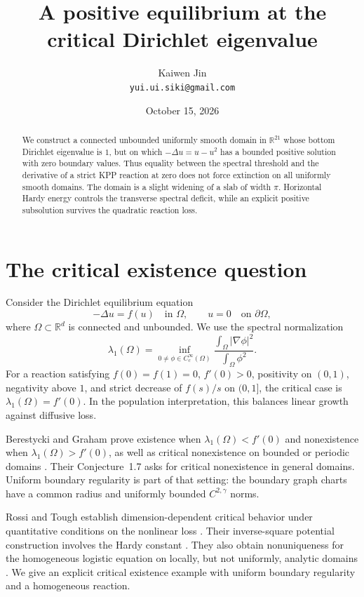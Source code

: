 \documentclass[11pt,a4paper]{article}
\title{A positive equilibrium at the critical Dirichlet eigenvalue}
\author{Kaiwen Jin\\[2pt]\small\texttt{yui.ui.siki@gmail.com}}
\date{October 15, 2026}
\newcommand{\R}{\mathbb R}
\newcommand{\Om}{\Omega}
\begin{document}
\maketitle
\begin{abstract}
We construct a connected unbounded uniformly smooth domain in
$\R^{21}$ whose bottom Dirichlet eigenvalue is $1$, but on which
$-\Delta u=u-u^2$ has a bounded positive solution with zero boundary values.
Thus equality between the spectral threshold and the derivative of a
strict KPP reaction at zero does not force extinction on all uniformly
smooth domains. The domain is a slight widening of a slab of width $\pi$.
Horizontal Hardy energy controls the transverse spectral deficit, while
an explicit positive subsolution survives the quadratic reaction loss.
\end{abstract}

\section{The critical existence question}
Consider the Dirichlet equilibrium equation
\begin{equation}\label{eq:problem}
 -\Delta u=f(u)\quad\text{in }\Om,\qquad u=0\quad\text{on }\partial\Om,
\end{equation}
where $\Om\subset\R^d$ is connected and unbounded. We use the spectral
normalization
\begin{equation}\label{eq:rayleigh}
 \lambda_1(\Om)=\inf_{0\ne\phi\in C_c^\infty(\Om)}
 \frac{\int_\Om|\nabla\phi|^2}{\int_\Om\phi^2}.
\end{equation}
For a reaction satisfying $f(0)=f(1)=0$, $f'(0)>0$, positivity on $(0,1)$,
negativity above $1$, and strict decrease of $f(s)/s$ on $(0,1]$, the
critical case is $\lambda_1(\Om)=f'(0)$. In the population interpretation,
this balances linear growth against diffusive loss.

Berestycki and Graham prove existence when $\lambda_1(\Om)<f'(0)$ and
nonexistence when $\lambda_1(\Om)>f'(0)$, as well as critical nonexistence
on bounded or periodic domains \cite[Theorem~1.5]{BG}. Their
Conjecture~1.7 asks for critical nonexistence in general domains. Uniform
boundary regularity is part of that setting: the boundary graph charts
have a common radius and uniformly bounded $C^{2,\gamma}$ norms.

Rossi and Tough establish dimension-dependent critical behavior under
quantitative conditions on the nonlinear loss \cite{RT}. Their
inverse-square potential construction involves the Hardy constant
\cite[Theorem~4.1]{RT}. They also obtain nonuniqueness for the homogeneous
logistic equation on locally, but not uniformly, analytic domains
\cite[Remark~4.2(e) and Section~7]{RT}. We give an explicit critical
existence example with uniform boundary regularity and a homogeneous reaction.
\end{document}

